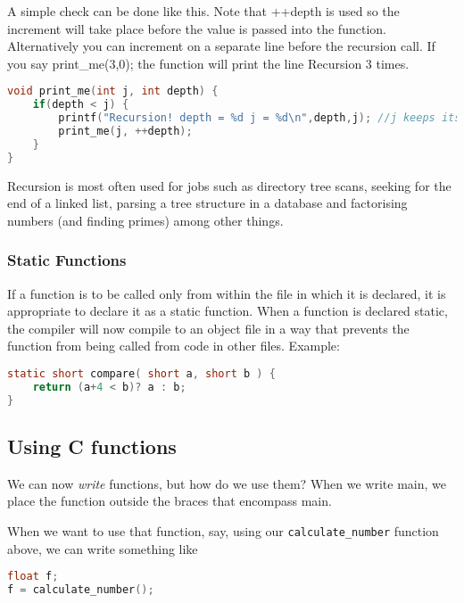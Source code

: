 A simple check can be done like this. Note that ++depth is used so the
increment will take place before the value is passed into the function.
Alternatively you can increment on a separate line before the recursion call.
If you say print\_me(3,0); the function will print the line Recursion 3 times.
\lstset{basicstyle=\scriptsize, numbers=left, captionpos=b, tabsize=4}
\begin{lstlisting}[caption=Section \thesection listing \arabic{funccnt},language={C},
breaklines=true,xleftmargin=15pt, label=lst:section\thesection listing\arabic{funccnt}]
void print_me(int j, int depth) {
	if(depth < j) {
	    printf("Recursion! depth = %d j = %d\n",depth,j); //j keeps its value
	    print_me(j, ++depth);
	}
}
\end{lstlisting}

Recursion is most often used for jobs such as directory tree scans, seeking for
the end of a linked list, parsing a tree structure in a database and
factorising numbers (and finding primes) among other things.

\subsubsection{Static Functions}
If a function is to be called only from within the file in which it is
declared, it is appropriate to declare it as a static function. When a function
is declared static, the compiler will now compile to an object file in a way
that prevents the function from being called from code in other files. Example:
\lstset{basicstyle=\scriptsize, numbers=left, captionpos=b, tabsize=4}
\begin{lstlisting}[caption=Section \thesection listing \arabic{funccnt},language={C},
breaklines=true,xleftmargin=15pt, label=lst:section\thesection listing\arabic{funccnt}]
static short compare( short a, short b ) {
	return (a+4 < b)? a : b;
}
\end{lstlisting}

\subsection{Using C functions}
We can now \emph{write} functions, but how do we use them? When we write main,
we place the function outside the braces that encompass main.

When we want to use that function, say, using our \texttt{calculate\_number}
function above, we can write something like
\lstset{basicstyle=\scriptsize, numbers=left, captionpos=b, tabsize=4}
\begin{lstlisting}[caption=Section \thesection listing \arabic{funccnt},language={C},
breaklines=true,xleftmargin=15pt, label=lst:section\thesection listing\arabic{funccnt}]
float f;
f = calculate_number();
\end{lstlisting}

